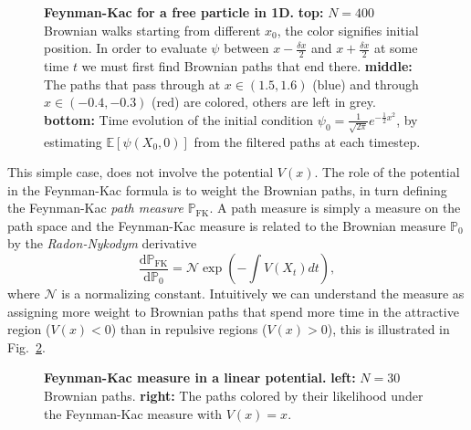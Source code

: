 \begin{figure}[H]
	\caption[Feynman-Kac for a free particle in 1D]{\textbf{Feynman-Kac for a free particle  in 1D.} \textbf{top:} $N=400$ Brownian walks starting from different $x_0$, the color signifies initial position. In order to evaluate $\psi$ between $x-\frac{\delta x}{2}$ and $x+\frac{\delta x}{2}$ at some time $t$ we must first find Brownian paths that end there. \textbf{middle:} The paths that pass through at $x \in (1.5, 1.6)$ (blue) and through $x \in (-0.4,-0.3)$ (red) are colored, others are left in grey. \textbf{bottom:} Time evolution of the initial condition $\psi_{0} = \frac{1}{\sqrt{2 \pi}} e^{-\frac{1}{2} x^{2}}$, by estimating ${\mathbb{E}}\left[\psi\left(X_{0}, 0\right)\right]$ from the filtered paths at each timestep.}
	\label{fig:fk_1d_example}
\end{figure}
This simple case, does not involve the potential $V(x)$. The role of the potential in the Feynman-Kac formula is to weight the Brownian paths, in turn defining the Feynman-Kac \emph{path measure} $\mathbb{P}_{\mathrm{FK}}$. A path measure is simply a measure on the path space and the Feynman-Kac measure is related to the Brownian measure $\mathbb{P}_{0}$ by the \emph{Radon-Nykodym} derivative
\begin{equation}
	\frac{\mathrm{d} \mathbb{P}_{\mathrm{FK}}}{\mathrm{d} \mathbb{P}_{0}}=\mathcal{N} \exp \left(-\int V\left(X_{t}\right) d t\right),
\end{equation}
where $\mathcal{N}$ is a normalizing constant. Intuitively we can understand the measure as assigning more weight to Brownian paths that spend more time in the attractive region ($V(x) < 0$) than in repulsive regions ($V(x) > 0$), this is illustrated in Fig.~\ref{fig:fkac_measure_reweight}.
\begin{figure}[H]
	\centering
	\caption[Feynman-Kac measure in a linear potential]{\textbf{Feynman-Kac measure in a linear potential.} 
		\textbf{left:} $N=30$ Brownian paths. \textbf{right:} The paths colored by their likelihood under the Feynman-Kac measure with $V(x)=x$. }
	\label{fig:fkac_measure_reweight}
\end{figure}
